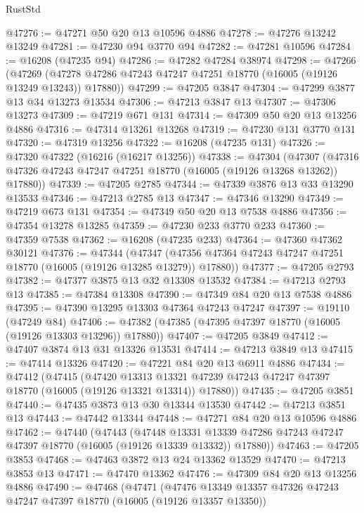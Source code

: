 \begin{lexlean}{RustStd}
\begin{coremodule}
@47276 := @47271 @50 @20 @13 @10596 @4886
@47278 := @47276 @13242 @13249
@47281 := @47230 @94 @3770 @94
@47282 := @47281 @10596
@47284 := @16208 (@47235 @94)
@47286 := @47282 @47284 @38974
@47298 := @47266
    (@47269 (@47278 @47286 @47243 @47247 @47251 @18770 (@16005 (@19126 @13249 @13243)) @17880))
@47299 := @47205 @3847
@47304 := @47299 @3877 @13 @34 @13273 @13534
@47306 := @47213 @3847 @13
@47307 := @47306 @13273
@47309 := @47219 @671 @131
@47314 := @47309 @50 @20 @13 @13256 @4886
@47316 := @47314 @13261 @13268
@47319 := @47230 @131 @3770 @131
@47320 := @47319 @13256
@47322 := @16208 (@47235 @131)
@47326 := @47320 @47322 (@16216 (@16217 @13256))
@47338 := @47304
    (@47307 (@47316 @47326 @47243 @47247 @47251 @18770 (@16005 (@19126 @13268 @13262)) @17880))
@47339 := @47205 @2785
@47344 := @47339 @3876 @13 @33 @13290 @13533
@47346 := @47213 @2785 @13
@47347 := @47346 @13290
@47349 := @47219 @673 @131
@47354 := @47349 @50 @20 @13 @7538 @4886
@47356 := @47354 @13278 @13285
@47359 := @47230 @233 @3770 @233
@47360 := @47359 @7538
@47362 := @16208 (@47235 @233)
@47364 := @47360 @47362 @30121
@47376 := @47344
    (@47347 (@47356 @47364 @47243 @47247 @47251 @18770 (@16005 (@19126 @13285 @13279)) @17880))
@47377 := @47205 @2793
@47382 := @47377 @3875 @13 @32 @13308 @13532
@47384 := @47213 @2793 @13
@47385 := @47384 @13308
@47390 := @47349 @84 @20 @13 @7538 @4886
@47395 := @47390 @13295 @13303 @47364 @47243 @47247
@47397 := @19110 (@47249 @84)
@47406 := @47382 (@47385 (@47395 @47397 @18770 (@16005 (@19126 @13303 @13296)) @17880))
@47407 := @47205 @3849
@47412 := @47407 @3874 @13 @31 @13326 @13531
@47414 := @47213 @3849 @13
@47415 := @47414 @13326
@47420 := @47221 @84 @20 @13 @6911 @4886
@47434 := @47412
    (@47415
      (@47420
        @13313
        @13321
        @47239
        @47243
        @47247
        @47397
        @18770
        (@16005 (@19126 @13321 @13314))
        @17880))
@47435 := @47205 @3851
@47440 := @47435 @3873 @13 @30 @13344 @13530
@47442 := @47213 @3851 @13
@47443 := @47442 @13344
@47448 := @47271 @84 @20 @13 @10596 @4886
@47462 := @47440
    (@47443
      (@47448
        @13331
        @13339
        @47286
        @47243
        @47247
        @47397
        @18770
        (@16005 (@19126 @13339 @13332))
        @17880))
@47463 := @47205 @3853
@47468 := @47463 @3872 @13 @24 @13362 @13529
@47470 := @47213 @3853 @13
@47471 := @47470 @13362
@47476 := @47309 @84 @20 @13 @13256 @4886
@47490 := @47468
    (@47471
      (@47476
        @13349
        @13357
        @47326
        @47243
        @47247
        @47397
        @18770
        (@16005 (@19126 @13357 @13350))

\end{coremodule}
\end{lexlean}
